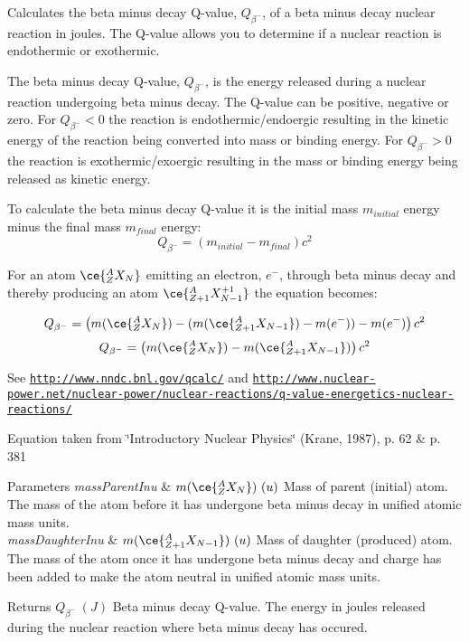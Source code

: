 Calculates the beta minus decay Q-\/value, $Q_{\beta^-}$, of a beta minus decay nuclear reaction in joules. The Q-\/value allows you to determine if a nuclear reaction is endothermic or exothermic. 

The beta minus decay Q-\/value, $Q_{\beta^-}$, is the energy released during a nuclear reaction undergoing beta minus decay. The Q-\/value can be positive, negative or zero. For $Q_{\beta^-} < 0$ the reaction is endothermic/endoergic resulting in the kinetic energy of the reaction being converted into mass or binding energy. For $Q_{\beta^-} > 0$ the reaction is exothermic/exoergic resulting in the mass or binding energy being released as kinetic energy.

To calculate the beta minus decay Q-\/value it is the initial mass $m_{initial}$ energy minus the final mass $m_{final}$ energy\+: \[Q_{\beta^-} = \left ( m_{initial}-m_{final}\right ) c^2\]

For an atom $\ce{ ^{A}_{Z}X_{N} }$ emitting an electron, $e^-$, through beta minus decay and thereby producing an atom $\ce{ ^{A}_{Z{+1}}X^{+1}_{N-1} }$ the equation becomes\+:

\[Q_{\beta^-} = \left ( m(\ce{ ^{A}_{Z}X_{N} }) - (m(\ce{ ^{A}_{Z{+1}}X_{N-1} }) - m(e^-)) - m(e^-)\right ) c^2\] \[Q_{\beta^-} = \left ( m(\ce{ ^{A}_{Z}X_{N} }) - m(\ce{ ^{A}_{Z{+1}}X_{N-1} })\right ) c^2\]

See \href{http://www.nndc.bnl.gov/qcalc/}{\tt http\+://www.\+nndc.\+bnl.\+gov/qcalc/} and \href{http://www.nuclear-power.net/nuclear-power/nuclear-reactions/q-value-energetics-nuclear-reactions/}{\tt http\+://www.\+nuclear-\/power.\+net/nuclear-\/power/nuclear-\/reactions/q-\/value-\/energetics-\/nuclear-\/reactions/}

Equation taken from \char`\"{}\+Introductory Nuclear Physics\char`\"{} (Krane, 1987), p. 62 \& p. 381


\begin{DoxyParams}{Parameters}
{\em mass\+Parent\+Inu} & $m(\ce{ ^{A}_{Z}X_{N} })\ (u)$ Mass of parent (initial) atom. The mass of the atom before it has undergone beta minus decay in unified atomic mass units. \\
\hline
{\em mass\+Daughter\+Inu} & $m(\ce{ ^{A}_{Z{+1}}X_{N-1} })\ (u)$ Mass of daughter (produced) atom. The mass of the atom once it has undergone beta minus decay and charge has been added to make the atom neutral in unified atomic mass units. \\
\hline
\end{DoxyParams}
\begin{DoxyReturn}{Returns}
$Q_{\beta^-}\ (J)$ Beta minus decay Q-\/value. The energy in joules released during the nuclear reaction where beta minus decay has occured. 
\end{DoxyReturn}
\mbox{\label{group___e_g_x_phys-_q_value_ga42468e998cf58a027a676755aa1339ba}} 
